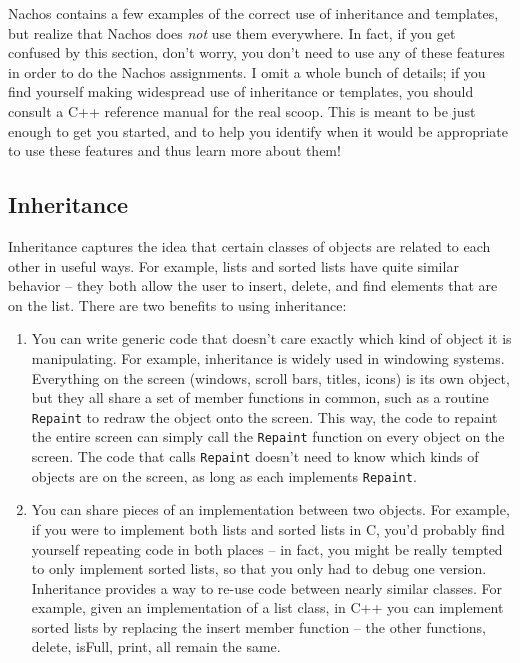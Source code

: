 Nachos contains a few examples of the correct use of inheritance
and templates, but realize that Nachos does {\em not} use them
everywhere.  In fact, if you get confused by this section, don't worry,
you don't need to use any of these features in order to do the Nachos
assignments.  I omit a whole bunch of details; if you find yourself
making widespread use of inheritance or templates, you should consult a C++
reference manual for the real scoop.  This is meant to
be just enough to get you started, and to help you identify when it would
be appropriate to use these features and thus learn more
about them!

\subsection{Inheritance}
Inheritance captures the idea that certain classes of objects are
related to each other in useful ways.  For example, lists
and sorted lists have quite similar behavior -- they both
allow the user to insert, delete, and find elements that are
on the list.  There are two benefits to using inheritance:

\begin{enumerate}

\item You can write generic code that doesn't
care exactly which kind of object it is manipulating.  For
example, inheritance is widely used in windowing systems.
Everything on the screen (windows, scroll bars, titles, icons)
is its own object, but they all share a set of member functions
in common, such as a routine {\tt Repaint} to redraw the object
onto the screen.  This way, the code to repaint the entire screen
can simply call the {\tt Repaint} function on every object on the screen.
The code that calls {\tt Repaint} doesn't need to know which
kinds of objects are on the screen, as long as each implements
{\tt Repaint}.

\item You can share pieces of an implementation between two
objects.  For example, if you were to implement both lists and
sorted lists in C, you'd probably find yourself repeating code
in both places -- in fact, you might be really tempted to
only implement sorted lists, so that you only had to debug
one version.  Inheritance provides a way to re-use code
between nearly similar classes.  For example, given an implementation
of a list class, in C++ you can implement sorted lists by replacing
the insert member function -- the other functions, delete, isFull,
print, all remain the same.

\end{enumerate}

